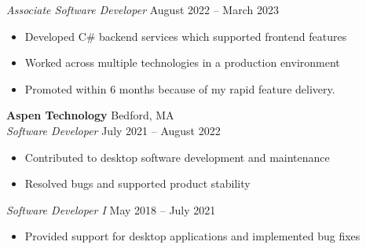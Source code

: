 \documentclass[11pt]{article}
\begin{document}
\textit{Associate Software Developer} \hfill August 2022 -- March 2023
\begin{itemize}[leftmargin=*]
    \item Developed C\# backend services which supported frontend features
    \item Worked across multiple technologies in a production environment
    \item Promoted within 6 months because of my rapid feature delivery.
\end{itemize}

\textbf{Aspen Technology} \hfill Bedford, MA \\
\textit{Software Developer} \hfill July 2021 -- August 2022
\begin{itemize}[leftmargin=*]
    \item Contributed to desktop software development and maintenance
    \item Resolved bugs and supported product stability
\end{itemize}

\textit{Software Developer I} \hfill May 2018 -- July 2021
\begin{itemize}[leftmargin=*]
    \item Provided support for desktop applications and implemented bug fixes
\end{itemize}
\end{document}
